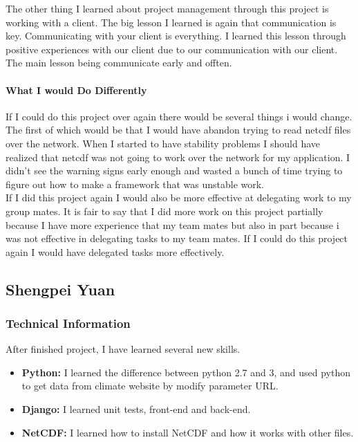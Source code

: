 \documentclass[onecolumn, draftclsnofoot,10pt, compsoc]{article}
\begin{document}
            The other thing I learned about project management through this project is working with a client. The big lesson I learned is again that communication is key. Communicating with your client is everything. I learned this lesson through positive experiences with our client due to our communication with our client. The main lesson being communicate early and offten.\\
            
            \paragraph{What I would Do Differently}
            If I could do this project over again there would be several things i would change. The first of which would be that I would have abandon trying to read netcdf files over the network. When I started to have stability problems I should have realized that netcdf was not going to work over the network for my application. I didn't see the warning signs early enough and wasted a bunch of time trying to figure out how to make a framework that was unstable work.\\
            
            If I did this project again I would also be more effective at delegating work to my group mates. It is fair to say that I did more work on this project partially because I have more experience that my team mates but also in part because i was not effective in delegating tasks to my team mates. If I could do this project again I would have delegated tasks more effectively.\\
        

    \subsection{Shengpei Yuan}
        \subsubsection{Technical Information}
			After finished project, I have learned several new skills.
			\begin{itemize}
					\item \textbf{Python:} I learned the difference between python 2.7 and 3, and used python to get data from climate website by modify parameter URL.
					\item \textbf{Django:} I learned unit tests, front-end and back-end.
					\item \textbf{NetCDF:} I learned how to install NetCDF and how it works with other files.
			\end{itemize}
\end{document}
